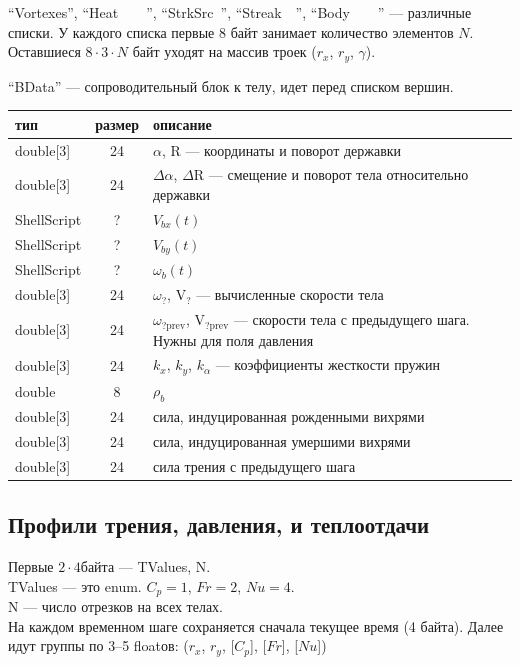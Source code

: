 \documentclass[14pt]{extreport}
\newcommand{\br}[1]{\boldsymbol{\mathrm{#1}}}
\renewcommand{\vec}[1]{\br{#1}}
\begin{document}
``Vortexes'', ``Heat~~~~'', ``StrkSrc~'', ``Streak~~'', ``Body~~~~'' --- различные списки. У каждого списка первые 8 байт занимает количество элементов $N$. Оставшиеся $8\cdot 3 \cdot N$ байт уходят на массив троек ($r_x$, $r_y$, $\gamma$).

``BData'' --- сопроводительный блок к телу, идет перед списком вершин.
\begin{tabular}{lcl}
\hline
тип & размер & описание\\\hline
double[3]    & 24 & $\alpha$, $\vec R$ --- координаты и поворот державки\\
double[3]    & 24 & $\Delta\alpha$, $\Delta\vec R$ --- смещение и поворот тела относительно державки\\
ShellScript  & ?  & $V_{bx}(t)$\\
ShellScript  & ?  & $V_{by}(t)$\\
ShellScript  & ?  & $\omega_{b}(t)$\\
double[3]    & 24 & $\omega_?$, $\vec V_?$ --- вычисленные скорости тела\\
double[3]    & 24 & $\omega_{?\text{prev}}$, $\vec V_{?\text{prev}}$ --- скорости тела с предыдущего шага. Нужны для поля давления\\
double[3]    & 24 & $k_x$, $k_y$, $k_\alpha$ --- коэффициенты жесткости пружин\\
double       & 8  & $\rho_b$\\
double[3]    & 24 & сила, индуцированная рожденными вихрями\\
double[3]    & 24 & сила, индуцированная умершими вихрями\\
double[3]    & 24 & сила трения с предыдущего шага\\
\hline
\end{tabular}

\subsection{Профили трения, давления, и теплоотдачи}
Первые $2 \cdot 4$байта --- TValues, N.\\
TValues --- это enum. $C_p=1$, $Fr=2$, $Nu=4$.\\
N --- число отрезков на всех телах.\\
На каждом временном шаге сохраняется сначала текущее время (4 байта). Далее идут группы по 3--5 floatов: ($r_x$, $r_y$, [$C_p$], [$Fr$], [$Nu$])
\end{document}
